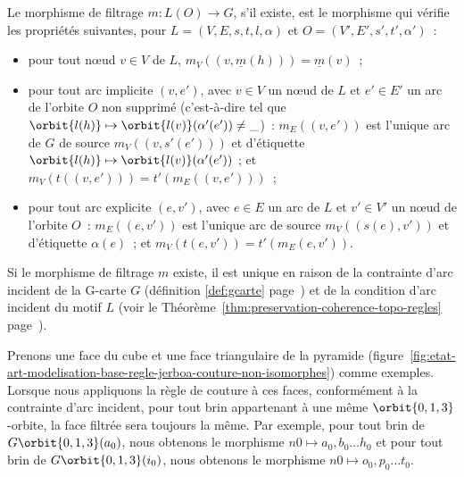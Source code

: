 \begin{definition}\label{def:filtrage-orbite-instanciation}%
	Le morphisme de filtrage $m : L(O) \rightarrow G$, s'il existe, est le morphisme qui
	vérifie les propriétés suivantes, pour $L = (V, E, s, t, l, \alpha)$ et
	$O = (V', E', s', t', \alpha')$~:
	\begin{itemize}
		\item pour tout n\oe ud $v \in V$ de $L$,
		      $m_V((v,\underline{m}(h))) = \underline{m}(v)$~;
		\item pour tout arc implicite $(v,e')$, avec $v \in V$ un n\oe ud de $L$ et
		      $e' \in E'$ un arc de l'orbite $O$ non supprimé (c'est-à-dire tel que
		      $\orbit{l(h)} \mapsto \orbit{l(v)} (\alpha'(e')) \neq \_$)~: $m_E((v,e'))$ est
		      l'unique arc de $G$ de source $m_V((v, s'(e')))$ et d'étiquette
		      $\orbit{l(h)} \mapsto \orbit{l(v)}(\alpha'(e'))$ ; et
		      $m_V(t((v, e'))) = t'(m_E((v,e')))$~;
		\item pour tout arc explicite $(e, v')$, avec $e \in E$ un arc de $L$ et
		      $v' \in V'$ un n\oe ud de l'orbite $O$~: $m_E((e, v'))$ est l'unique arc de
		      source $m_V((s(e), v'))$ et d'étiquette $\alpha(e)$~; et
		      $m_V(t(e,v')) = t'(m_E(e,v'))$.
	\end{itemize}
\end{definition}

\begin{remarque}
	Si le morphisme de filtrage $m$ existe, il est unique en raison de la
	contrainte d'arc incident de la G-carte $G$ (définition \ref{def:gcarte}
	page~\pageref{def:gcarte}) et de la condition d'arc incident du motif $L$
	(voir le Théorème~\ref{thm:preservation-coherence-topo-regles} page~\pageref{thm:preservation-coherence-topo-regles}).
\end{remarque}

Prenons une face du cube et une face triangulaire de la pyramide (figure~\ref{fig:etat-art-modelisation-base-regle-jerboa-couture-non-isomorphes})
comme exemples. %
Lorsque nous appliquons la règle de couture à ces faces, conformément à la
contrainte d'arc incident, pour tout brin appartenant à une même
\(\orbit{0,1,3}\)-orbite, la face filtrée sera toujours la même. %
Par exemple, pour tout brin de \(G\orbit{0,1,3}(a_{0})\), nous obtenons le
morphisme \(n0 \mapsto {a_{0},b_{0}\dots h_{0}}\) et pour tout brin de
\(G\orbit{0,1,3}(i_{0})\), nous obtenons le morphisme
\(n0 \mapsto {o_{0},p_{0}\dots t_{0}}\). %

